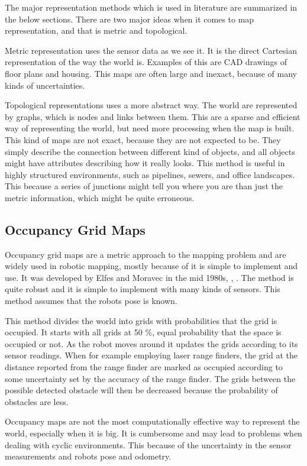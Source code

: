 The major representation methods which is used in literature are summarized in the below
sections. There are two major ideas when it comes to map representation, and that is
metric and topological.

Metric representation uses the sensor data as we see it. It is the direct Cartesian
representation of the way the world is. Examples of this are CAD drawings of floor plans
and housing. This maps are often large and inexact, because of many kinds of
uncertainties.

Topological representations uses a more abstract way. The world are represented by graphs,
which is nodes and links between them. This are a sparse and efficient way of representing
the world, but need more processing when the map is built. This kind of maps are not
exact, because they are not expected to be. They simply describe the connection between
different kind of objects, and all objects might have attributes describing how it really
looks. This method is useful in highly structured environments, such as pipelines, sewers,
and office landscapes. This because a series of junctions might tell you where you are
than just the metric information, which might be quite erroneous. 


\subsection{Occupancy Grid Maps}
Occupancy grid maps are a metric approach to the mapping problem and are widely used in 
robotic mapping, mostly because of it is simple to implement and use. It was developed 
by Elfes and Moravec in the mid 1980s, \cite{elfes}, \cite{moravec}. The method is quite 
robust and it is simple to implement with many kinds of sensors. This method assumes that 
the robots pose is known.

This method divides the world into grids with probabilities that the grid is occupied. It
starts with all grids at 50 \%, equal probability that the space is occupied or not. As
the robot moves around it updates the grids according to its sensor readings. When for
example employing laser range finders, the grid at the distance reported from the range
finder are marked as occupied according to some uncertainty set by the accuracy of the
range finder. The grids between the possible detected obstacle will then be decreased
because the probability of obstacles are less. 

Occupancy maps are not the most computationally effective way to represent the world,
especially when it is big. It is cumbersome and may lead to problems when dealing with
cyclic environments. This because of the uncertainty in the sensor measurements and robots
pose and odometry. 


